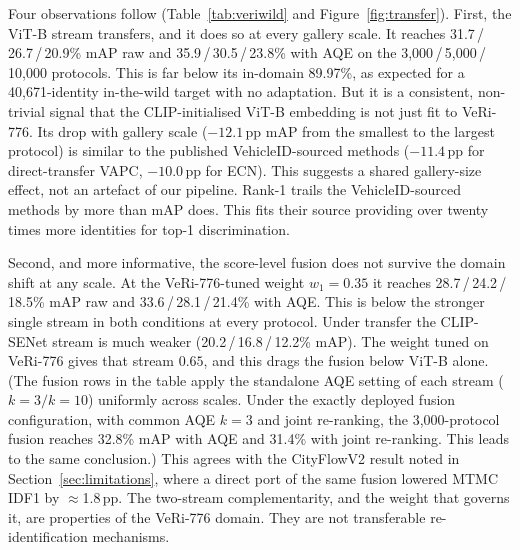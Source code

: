 Four observations follow (Table~\ref{tab:veriwild} and Figure~\ref{fig:transfer}). First, the ViT-B stream transfers, and it does so at every gallery scale. It reaches 31.7\,/\,26.7\,/\,20.9\% mAP raw and 35.9\,/\,30.5\,/\,23.8\% with AQE on the 3{,}000\,/\,5{,}000\,/\,10{,}000 protocols. This is far below its in-domain 89.97\%, as expected for a 40{,}671-identity in-the-wild target with no adaptation. But it is a consistent, non-trivial signal that the CLIP-initialised ViT-B embedding is not just fit to VeRi-776. Its drop with gallery scale ($-12.1$\,pp mAP from the smallest to the largest protocol) is similar to the published VehicleID-sourced methods ($-11.4$\,pp for direct-transfer VAPC, $-10.0$\,pp for ECN). This suggests a shared gallery-size effect, not an artefact of our pipeline. Rank-1 trails the VehicleID-sourced methods by more than mAP does. This fits their source providing over twenty times more identities for top-1 discrimination.

Second, and more informative, the score-level fusion does not survive the domain shift at any scale. At the VeRi-776-tuned weight $w_1{=}0.35$ it reaches 28.7\,/\,24.2\,/\,18.5\% mAP raw and 33.6\,/\,28.1\,/\,21.4\% with AQE. This is below the stronger single stream in both conditions at every protocol. Under transfer the CLIP-SENet stream is much weaker (20.2\,/\,16.8\,/\,12.2\% mAP). The weight tuned on VeRi-776 gives that stream $0.65$, and this drags the fusion below ViT-B alone. (The fusion rows in the table apply the standalone AQE setting of each stream ($k{=}3/k{=}10$) uniformly across scales. Under the exactly deployed fusion configuration, with common AQE $k{=}3$ and joint re-ranking, the 3{,}000-protocol fusion reaches 32.8\% mAP with AQE and 31.4\% with joint re-ranking. This leads to the same conclusion.) This agrees with the CityFlowV2 result noted in Section~\ref{sec:limitations}, where a direct port of the same fusion lowered MTMC IDF1 by $\approx$1.8\,pp. The two-stream complementarity, and the weight that governs it, are properties of the VeRi-776 domain. They are not transferable re-identification mechanisms.
